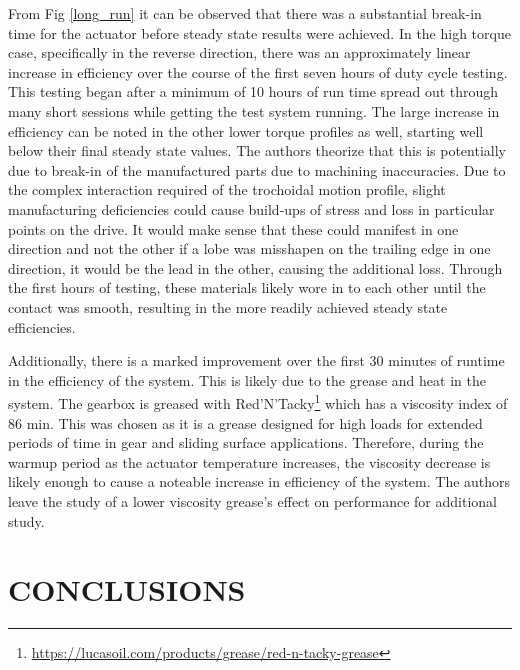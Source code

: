 \documentclass[letterpaper, 10 pt, conference]{ieeeconf}  %
\begin{document}
From Fig \ref{long_run} it can be observed that there was a substantial break-in time for the actuator before steady state results were achieved. In the high torque case, specifically in the reverse direction, there was an approximately linear increase in efficiency over the course of the first seven hours of duty cycle testing. This testing began after a minimum of 10 hours of run time spread out through many short sessions while getting the test system running. The large increase in efficiency can be noted in the other lower torque profiles as well, starting well below their final steady state values. The authors theorize that this is potentially due to break-in of the manufactured parts due to machining inaccuracies. Due to the complex interaction required of the trochoidal motion profile, slight manufacturing deficiencies could cause build-ups of stress and loss in particular points on the drive. It would make sense that these could manifest in one direction and not the other if a lobe was misshapen on the trailing edge in one direction, it would be the lead in the other, causing the additional loss. Through the first hours of testing, these materials likely wore in to each other until the contact was smooth, resulting in the more readily achieved steady state efficiencies. 

Additionally, there is a marked improvement over the first 30 minutes of runtime in the efficiency of the system. This is likely due to the grease and heat in the system. The gearbox is greased with Red'N'Tacky\footnote{\url{https://lucasoil.com/products/grease/red-n-tacky-grease}} which has a viscosity index of 86 min. This was chosen as it is a grease designed for high loads for extended periods of time in gear and sliding surface applications. Therefore, during the warmup period as the actuator temperature increases, the viscosity decrease is likely enough to cause a noteable increase in efficiency of the system. The authors leave the study of a lower viscosity grease's effect on performance for additional study. 

\section{CONCLUSIONS}
\end{document}
